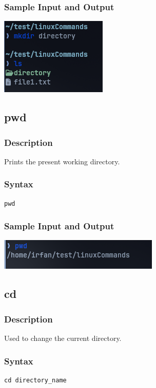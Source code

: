\subsubsection{Sample Input and Output}
\includegraphics[]{Cycle_1//Outputs/mkdir.png}


\subsection{pwd}
\subsubsection{Description}
Prints the present working directory.

\subsubsection{Syntax}
\begin{verbatim}
pwd
\end{verbatim}

\subsubsection{Sample Input and Output}
\includegraphics[]{Cycle_1//Outputs/pwd.png}

\subsection{cd}
\subsubsection{Description}
Used to change the current directory.

\subsubsection{Syntax}
\begin{verbatim}
cd directory_name
\end{verbatim}

